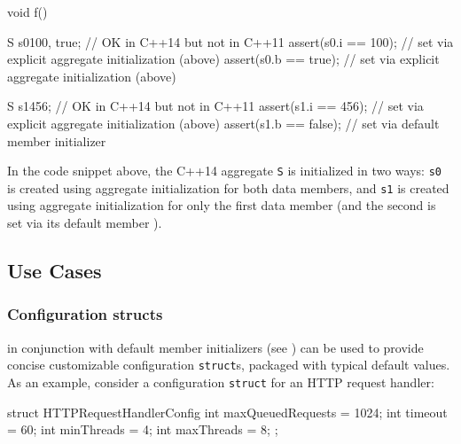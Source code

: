 \begin{emcppslisting}[language=C++]
void f()
{
    S s0{100, true};        // OK in C++14 but not in C++11
    assert(s0.i == 100);    // set via explicit aggregate initialization (above)
    assert(s0.b == true);   // set via explicit aggregate initialization (above)

    S s1{456};              // OK in C++14 but not in C++11
    assert(s1.i == 456);    // set via explicit aggregate initialization (above)
    assert(s1.b == false);  // set via default member initializer
}
\end{emcppslisting}

\noindent In the code snippet above, the C++14 aggregate \lstinline!S! is initialized
in two ways: \lstinline!s0! is created using aggregate initialization for
both data members, and \lstinline!s1! is created using aggregate
initialization for only the first data member (and the second is set via its
default member ).

\subsection[Use Cases]{Use Cases}\label{use-cases}

\subsubsection[Configuration \lstinline!struct!s]{Configuration {\SubsubsecCode struct}s}\label{configuration-structs}

 in conjunction with default member initializers (see ) can be used to provide concise customizable
configuration \lstinline!struct!s, packaged with typical default values. As
an example, consider a configuration \lstinline!struct! for an HTTP request
handler:

\begin{emcppslisting}[language=C++]
struct HTTPRequestHandlerConfig
{
    int maxQueuedRequests = 1024;
    int timeout           = 60;
    int minThreads        = 4;
    int maxThreads        = 8;
};
\end{emcppslisting}

